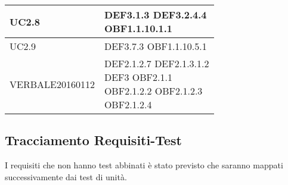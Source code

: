 \documentclass{scalatekids-article}
\begin{document}
\begin{longtable}[H]{|p{5.5cm}|p{5.5cm}|}
\hline
UC2.8 & \multiLineCell[t]{DEF3.1.3 DEF3.2.4.4\\OBF1.1.10.1.1\\}\\
\hline
UC2.9 & \multiLineCell[t]{DEF3.7.3 OBF1.1.10.5.1\\}\\
\hline
VERBALE20160112 & \multiLineCell[t]{DEF2.1.2.7 DEF2.1.3.1.2\\DEF3 OBF2.1.1\\OBF2.1.2.2 OBF2.1.2.3\\OBF2.1.2.4}\\
\hline
\end{longtable}







\subsection{Tracciamento Requisiti-Test}

I requisiti che non hanno test abbinati è stato previsto che 
saranno mappati successivamente dai test di unità. 
\end{document}
